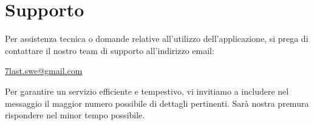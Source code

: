 \newpage
\section{Supporto}
Per assistenza tecnica o domande relative all’utilizzo dell’applicazione, si prega di contattare il nostro team di supporto all'indirizzo email: 
\begin{center}
    \href{mailto:7last.swe@gmail.com}{7last.swe@gmail.com}
\end{center} 
Per garantire un servizio efficiente e tempestivo, vi invitiamo a includere nel messaggio il maggior numero possibile di dettagli pertinenti. Sarà nostra premura rispondere nel minor tempo possibile.